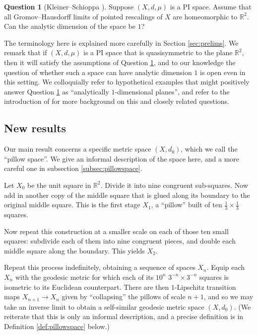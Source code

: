 \documentclass{amsart}
\theoremstyle{plain}
\theoremstyle{definition}
\newtheorem{question}[theorem]{Question}
\numberwithin{equation}{section}
\numberwithin{theorem}{section}
\newcommand{\RR}{\mathbb{R}}
\begin{document}
\begin{question}[Kleiner--Schioppa \cite{KleinerSchioppa}]\label{q:1dimplane}
Suppose $(X,d,\mu)$ is a PI space. Assume that all Gromov--Hausdorff limits of pointed rescalings of $X$ are homeomorphic to $\mathbb{R}^2$. Can the analytic dimension of the space be $1$?
\end{question}
The terminology here is explained more carefully in Section \ref{sec:prelims}. We remark that if $(X,d,\mu)$ is a PI space that is quasisymmetric to the plane $\RR^2$, then it will satisfy the assumptions of Question \ref{q:1dimplane}, and to our knowledge the question of whether such a space can have analytic dimension $1$ is open even in this setting. We colloquially refer to hypothetical examples that might positively answer Question \ref{q:1dimplane} as ``analytically $1$-dimensional planes'', and refer to the introduction of \cite{DavidKleiner} for more background on this and closely related questions.


\subsection{New results}
Our main result concerns a specific metric space $(X,d_0)$, which we call the ``pillow space''. We give an informal description of the space here, and a more careful one in subsection \ref{subsec:pillowspace}.

Let $X_0$ be the unit square in $\RR^2$. Divide it into nine congruent sub-squares. Now add in another copy of the middle square that is glued along its boundary to the original middle square. This is the first stage $X_1$, a ``pillow'' built of ten $\frac13\times\frac13$ squares.

Now repeat this construction at a smaller scale on each of those ten small squares: subdivide each of them into nine congruent pieces, and double each middle square along the boundary. This yields $X_2$.

Repeat this process indefinitely, obtaining a sequence of spaces $X_n$. Equip each $X_n$ with the geodesic metric for which each of its $10^n$ $3^{-n}\times 3^{-n}$ squares is isometric to its Euclidean counterpart.  There are then $1$-Lipschitz transition maps $X_{n+1}\rightarrow X_n$ given by ``collapsing'' the pillows of scale $n+1$, and so we may take an inverse limit to obtain a self-similar geodesic metric space $(X, d_0)$. (We reiterate that this is only an informal description, and a precise definition is in Definition \ref{def:pillowspace} below.) 
\end{document}
